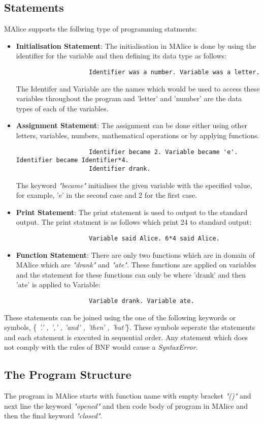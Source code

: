 \documentclass[a4wide, 11pt]{article}
\begin{document}
	\subsection{Statements}
	\label{sec:statements}
		MAlice supports the follwing type of programming statments:
		\begin{itemize}
			\item {\bf Initialisation Statement}: The initialisation in MAlice is done by using the identifier
		 		for the variable and then defining its data type as follows:
				\begin{verbatim}
					Identifier was a number. Variable was a letter.
				\end{verbatim}	
				The Identifer and Variable are the names which would be used to access these variables throughout
				the program and 'letter' and 'number' are the data types of each of the variables.
			\item {\bf Assignment Statement}: The assignment can be done either using other letters, variables, numbers,
				mathematical operations or by applying functions.
				\begin{verbatim}
					Identifier became 2. Variable became 'e'. Identifier became Identifier*4.
					Identifier drank.
				\end{verbatim}
				The keyword \emph{"became"} initialises the given variable with the specified value, for example,
				'e' in the second case and 2 for the first case.
			\item {\bf Print Statement}: The print statement is used to output to the standard output. The print
				statment is as follows which print 24 to standard output:
				\begin{verbatim}
					Variable said Alice. 6*4 said Alice.
				\end{verbatim}
			\item {\bf Function Statement}: There are only two functions which are in domain of MAlice which are
				\emph{"drank"} and \emph{"ate"}. These functions are applied on variables and the statement for these 
				functions can only be where 'drank' and then 'ate' is applied to Variable:
				\begin{verbatim}
					Variable drank. Variable ate.	
				\end{verbatim}
		\end{itemize}
		These statements can be joined using the one of the following keywords or symbols, \{ \emph{'.' , ',' , 'and' , 'then' , 'but'}\}.
		These symbols seperate the statements and each statement is executed in sequential order. Any statement which does not comply with
		the rules of BNF would cause a \emph{SyntaxError}.

	\subsection{The Program Structure}
	\label{sec:progStr}
		The program in MAlice starts with function name with empty bracket \emph {"()"} and next line the keyword \emph{"opened"}
		and then code body of program in MAlice and then the final keyword \emph{"closed"}.
\end{document}
